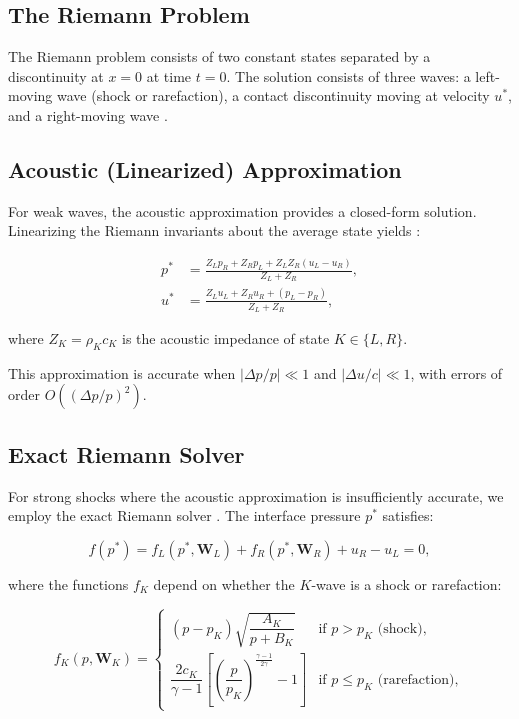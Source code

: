 \documentclass[12pt,a4paper]{article}
\begin{document}
\subsection{The Riemann Problem}

The Riemann problem consists of two constant states separated by a discontinuity at $x = 0$ at time $t = 0$. The solution consists of three waves: a left-moving wave (shock or rarefaction), a contact discontinuity moving at velocity $u^*$, and a right-moving wave \citep{Toro2009}.

\subsection{Acoustic (Linearized) Approximation}

For weak waves, the acoustic approximation provides a closed-form solution. Linearizing the Riemann invariants about the average state yields \citep{Toro2009}:

\begin{align}
    p^* &= \frac{Z_L p_R + Z_R p_L + Z_L Z_R (u_L - u_R)}{Z_L + Z_R}, \label{eq:acoustic_p} \\
    u^* &= \frac{Z_L u_L + Z_R u_R + (p_L - p_R)}{Z_L + Z_R}, \label{eq:acoustic_u}
\end{align}

\noindent where $Z_K = \rho_K c_K$ is the acoustic impedance of state $K \in \{L, R\}$.

This approximation is accurate when $|\Delta p / p| \ll 1$ and $|\Delta u / c| \ll 1$, with errors of order $O((\Delta p/p)^2)$.

\subsection{Exact Riemann Solver}

For strong shocks where the acoustic approximation is insufficiently accurate, we employ the exact Riemann solver \citep{Toro2009}. The interface pressure $p^*$ satisfies:

\begin{equation}
    f(p^*) = f_L(p^*, \mathbf{W}_L) + f_R(p^*, \mathbf{W}_R) + u_R - u_L = 0,
    \label{eq:exact_riemann}
\end{equation}

\noindent where the functions $f_K$ depend on whether the $K$-wave is a shock or rarefaction:

\begin{equation}
    f_K(p, \mathbf{W}_K) = \begin{cases}
        (p - p_K) \sqrt{\dfrac{A_K}{p + B_K}} & \text{if } p > p_K \text{ (shock)}, \\[12pt]
        \dfrac{2c_K}{\gamma - 1} \left[ \left(\dfrac{p}{p_K}\right)^{\frac{\gamma-1}{2\gamma}} - 1 \right] & \text{if } p \leq p_K \text{ (rarefaction)},
    \end{cases}
    \label{eq:f_function}
\end{equation}
\end{document}
